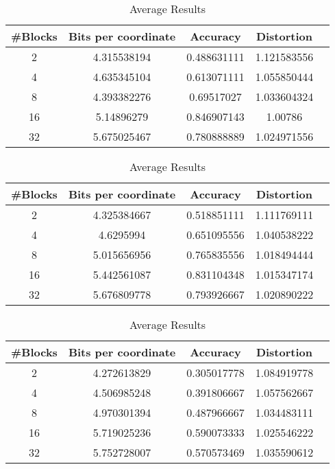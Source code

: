 \begin{table}[h!]
	\centering
	\caption{Average Results \sift{} \qs{}}
	\label{table:avg_sift_qs}
	\begin{tabular}{ccccc}
		\hline
		\#Blocks & Bits per coordinate & Accuracy  & Distortion \\ \hline
		2 & 4.315538194	& 0.488631111 & 1.121583556  \\
		4 & 4.635345104 & 0.613071111 & 1.055850444  \\
		8 & 4.393382276 & 0.69517027 & 1.033604324 \\
		16 & 5.14896279 & 0.846907143 & 1.00786 \\
		32 & 5.675025467 & 0.780888889 & 1.024971556 \\
		\hline
	\end{tabular}
\end{table}

\begin{table}[h!]
	\centering
	\caption{Average Results \sift{} \qsr{}}
	\label{table:avg_sift_qsr}
	\begin{tabular}{ccccc}
		\hline
		\#Blocks & Bits per coordinate & Accuracy  & Distortion \\ \hline
		2 & 4.325384667	& 0.518851111 & 1.111769111  \\
		4 & 4.6295994 & 0.651095556 & 1.040538222  \\
		8 & 5.015656956 & 0.765835556 & 1.018494444 \\
		16 & 5.442561087 & 0.831104348 & 1.015347174 \\
		32 & 5.676809778 & 0.793926667 & 1.020890222 \\
		\hline
	\end{tabular}
\end{table}

\begin{table}[h!]
	\centering
	\caption{Average Results \clust{} \qs{}}
	\label{table:avg_clust_qs}	
	\begin{tabular}{ccccc}
		\hline
		\#Blocks & Bits per coordinate & Accuracy  & Distortion \\ \hline
		2 & 4.272613829	& 0.305017778 & 1.084919778  \\
		4 & 4.506985248 & 0.391806667 & 1.057562667  \\
		8 & 4.970301394 & 0.487966667 & 1.034483111 \\
		16 & 5.719025236 & 0.590073333 & 1.025546222 \\
		32 & 5.752728007 & 0.570573469 & 1.035590612 \\
		\hline
	\end{tabular}
\end{table}

